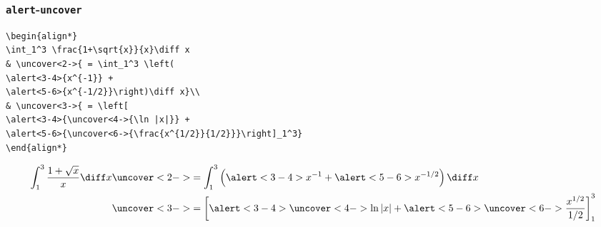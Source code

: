 \begin{frame}[fragile]
\frametitle{\texttt{alert}-\texttt{uncover}}
{\small
\begin{verbatim}
\begin{align*}
\int_1^3 \frac{1+\sqrt{x}}{x}\diff x
& \uncover<2->{ = \int_1^3 \left( 
\alert<3-4>{x^{-1}} + 
\alert<5-6>{x^{-1/2}}\right)\diff x}\\
& \uncover<3->{ = \left[ 
\alert<3-4>{\uncover<4->{\ln |x|}} + 
\alert<5-6>{\uncover<6->{\frac{x^{1/2}}{1/2}}}\right]_1^3}
\end{align*}
\end{verbatim}
}

\begin{example}
\abovedisplayskip=0pt
\belowdisplayskip=-15pt
\begin{align*}
\int_1^3 \frac{1+\sqrt{x}}{x}\diff x%
& \uncover<2->{ = \int_1^3 \left( \alert<3-4>{x^{-1}} + \alert<5-6>{x^{-1/2}}\right)\diff x}\\%
& \uncover<3->{ = \left[ \alert<3-4>{\uncover<4->{\ln |x|}} + \alert<5-6>{\uncover<6->{\frac{x^{1/2}}{1/2}}}\right]_1^3}%
\end{align*}
\end{example}
\end{frame}
